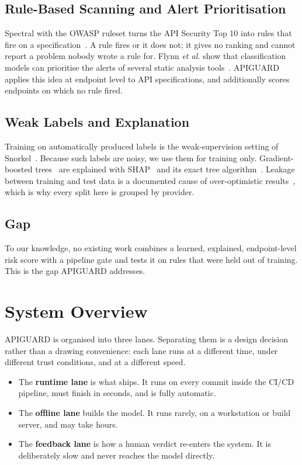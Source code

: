 \documentclass[conference]{IEEEtran}
\begin{document}
\subsection{Rule-Based Scanning and Alert Prioritisation}
Spectral with the OWASP ruleset turns the API Security Top 10 into rules that fire on a
specification~\cite{spectralowasp,owasptop10}. A rule fires or it does not; it gives no ranking
and cannot report a problem nobody wrote a rule for. Flynn \emph{et al.} show that
classification models can prioritise the alerts of several static analysis tools~\cite{flynn}.
APIGUARD applies this idea at endpoint level to API specifications, and additionally scores
endpoints on which no rule fired.

\subsection{Weak Labels and Explanation}
Training on automatically produced labels is the weak-supervision setting of
Snorkel~\cite{snorkel}. Because such labels are noisy, we use them for training only.
Gradient-boosted trees~\cite{xgboost} are explained with SHAP~\cite{shap} and its exact
tree algorithm~\cite{treeshap}. Leakage between training and test data is a documented cause of
over-optimistic results~\cite{kapoor}, which is why every split here is grouped by provider.

\subsection{Gap}
To our knowledge, no existing work combines a learned, explained, endpoint-level risk score
with a pipeline gate and tests it on rules that were held out of training. This is the gap
APIGUARD addresses.

\section{System Overview}
APIGUARD is organised into three lanes. Separating them is a design decision rather than a
drawing convenience: each lane runs at a different time, under different trust conditions,
and at a different speed.

\begin{itemize}
\item The \textbf{runtime lane} is what ships. It runs on every commit inside the CI/CD
pipeline, must finish in seconds, and is fully automatic.
\item The \textbf{offline lane} builds the model. It runs rarely, on a workstation or build
server, and may take hours.
\item The \textbf{feedback lane} is how a human verdict re-enters the system. It is
deliberately slow and never reaches the model directly.
\end{itemize}
\end{document}
